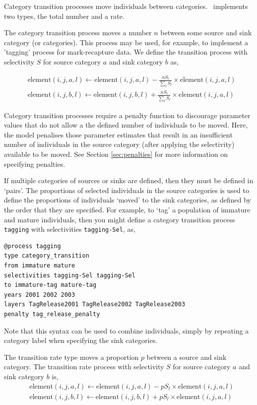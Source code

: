 Category transition processes move individuals between categories. \SPM\ implements two types, the total number and a rate. 

The category transition process moves a number $n$ between some source and sink category (or categories). This process may be used, for example, to implement a 'tagging' process for mark-recapture data. We define the transition process with selectivity $S$ for source category $a$ and sink category $b$ as,

\begin{equation}\begin{split}
  & \text{element}(i,j,a,l) \leftarrow \text{element}(i,j,a,l) - \frac{nS_l}{\sum\limits_l S_l} \times \text{element}(i,j,a,l) \\
  & \text{element}(i,j,b,l) \leftarrow \text{element}(i,j,b,l) + \frac{nS_l}{\sum\limits_l S_l} \times \text{element}(i,j,a,l)
\end{split}\end{equation}

Category transition processes require a penalty function to discourage parameter values that do not allow a the defined number of individuals to be moved. Here, the model penalises those parameter estimates that result in an insufficient number of individuals in the source category (after applying the selectivity) available to be moved. See Section \ref{sec:penalties} for more information on specifying penalties.

If multiple categories of sources or sinks are defined, then they must be defined in `pairs'. The proportions of selected individuals in the source categories is used to define the proportions of individuals `moved' to the sink categories, as defined by the order that they are specified. For example, to `tag' a population of immature and mature individuals, then you might define a category transition process \texttt{tagging} with selectivities \texttt{tagging-Sel}, as,

\begin{verbatim}
@process tagging
type category_transition
from immature mature
selectivities tagging-Sel tagging-Sel
to immature-tag mature-tag
years 2001 2002 2003
layers TagRelease2001 TagRelease2002 TagRelease2003
penalty tag_release_penalty
\end{verbatim}

Note that this syntax can be used to combine individuals, simply by repeating a category label when specifying the sink categories.

The transition rate type moves a proportion $p$ between a source and sink category. The transition rate process with selectivity $S$ for source category $a$ and sink category $b$ is,
\begin{equation}\begin{split}
  & \text{element}(i,j,a,l) \leftarrow \text{element}(i,j,a,l) - pS_l \times \text{element}(i,j,a,l) \\
  & \text{element}(i,j,b,l) \leftarrow \text{element}(i,j,b,l) + pS_l \times \text{element}(i,j,a,l)
\end{split}\end{equation}

